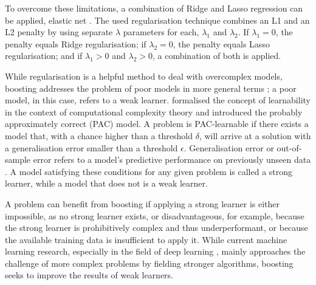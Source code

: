 To overcome these limitations, a combination of Ridge and Lasso regression can 
be applied, elastic net \citep{Zou2005}. The used regularisation technique 
combines an L1 and an L2 penalty by using separate $\lambda$ parameters for 
each, $\lambda_{1}$ and $\lambda_{2}$. If $\lambda_{1}=0$, the penalty equals 
Ridge regularisation; if $\lambda_{2}=0$, the penalty equals Lasso 
regularisation; and if $\lambda_{1}>0$ and $\lambda_{2}>0$, a combination of 
both is applied.
\bigbreak

\noindent While  regularisation is a helpful method to 
deal with overcomplex models, boosting addresses the problem of poor models in 
more general terms \citep{Freund1999}; a \textquotesingle{}poor 
model\textquotesingle{}, in this case, refers to a weak learner. 
\citet{Valiant} formalised the concept of learnability in the context of 
computational complexity theory and introduced the probably approximately 
correct (PAC) model. A problem is PAC-learnable if there exists a model that, 
with a chance higher than a threshold $\delta$, will arrive at a solution with 
a generalisation error smaller than a threshold $\epsilon$. Generalisation 
error or out-of-sample error refers to a model's predictive performance on 
previously unseen data \citep{Bousquet2004}. A model satisfying these 
conditions for any given problem is called a strong learner, while a model 
that does not is a weak learner.

A problem can benefit from boosting if applying a strong learner is either 
impossible, as no strong learner exists, or disadvantageous, for example, 
because the strong learner is prohibitively complex and thus underperformant, 
or because the available training data is insufficient to apply it. While 
current machine learning research, especially in the field of deep learning 
\citep{LeCun2015}, mainly approaches the challenge of more complex problems by 
fielding stronger algorithms, boosting seeks to improve the results of weak 
learners.

